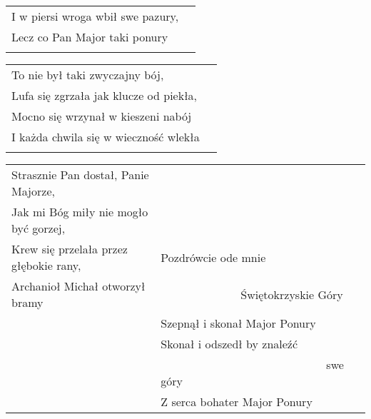 \documentclass[a5paper]{article}
\begin{document}
\noindent
\begin{tabular}{@{}p{7.50cm}p{3cm}@{}}
I w piersi wroga wbił swe pazury,\\
Lecz co Pan Major taki ponury\\\\
\end{tabular}

\noindent
\begin{tabular}{@{}p{6cm}p{6cm}@{}}
To nie był taki zwyczajny bój,\\
Lufa się zgrzała jak klucze od piekła,\\
Mocno się wrzynał w kieszeni nabój\\
I każda chwila się w wieczność wlekła\\\\
\end{tabular}

\noindent
\begin{tabular}{@{}p{6cm}|p{6cm}@{}}
Strasznie Pan dostał, Panie Majorze,\\
Jak mi Bóg miły nie mogło być gorzej,\\
Krew się przelała przez głębokie rany, & Pozdrówcie ode mnie \\
Archanioł Michał otworzył bramy		   & ~~~~~~~~~~~~~~Świętokrzyskie Góry \\
 & Szepnął i skonał Major Ponury \\

& Skonał i odszedł by znaleźć \\
& ~~~~~~~~~~~~~~~~~~~~~~~~~~~~~swe góry \\
& Z serca bohater Major Ponury
\end{tabular}
\end{document}
